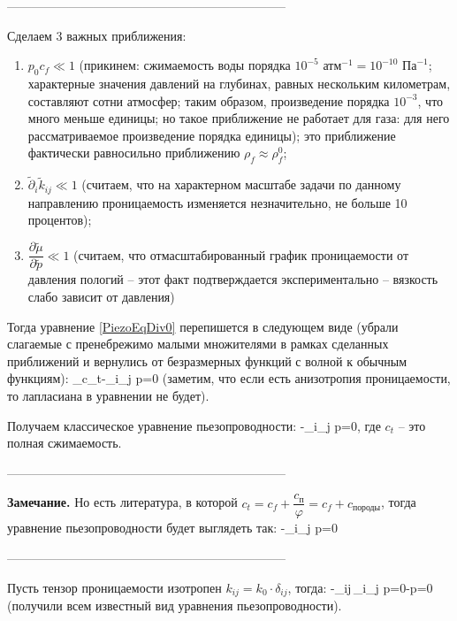 --------------------------------------------------------------------

Сделаем 3 важных приближения:
\begin{enumerate}
	\item $p_0 c_f\ll 1$ (прикинем: сжимаемость воды порядка $10^{-5}\text{ атм}^{-1}=10^{-10}\text{ Па}^{-1}$; характерные значения давлений на глубинах, равных нескольким километрам, составляют сотни атмосфер; таким образом, произведение порядка $10^{-3}$, что много меньше единицы; но такое приближение не работает для газа: для него рассматриваемое произведение порядка единицы); это приближение фактически равносильно приближению $\rho_f\approx\rho_f^0$;
	\item $\tilde{\partial}_i\tilde{k}_{ij}\ll 1$ (считаем, что на характерном масштабе задачи по данному направлению проницаемость изменяется незначительно, не больше 10 процентов);
	\item $\dfrac{\partial\tilde{\mu}}{\partial\tilde{p}}\ll 1$ (считаем, что отмасштабированный график проницаемости от давления пологий -- этот факт подтверждается экспериментально -- вязкость слабо зависит от давления)
\end{enumerate}

Тогда уравнение \eqref{PiezoEqDiv0} перепишется в следующем виде (убрали слагаемые с пренебрежимо малыми множителями в рамках сделанных приближений и вернулись от безразмерных функций с волной к обычным функциям):
\beq
{}_{c_t}-\partial_i\partial_j p=0
\eeq
(заметим, что если есть анизотропия проницаемости, то лапласиана в уравнении не будет).

Получаем классическое уравнение пьезопроводности:
\beq
{}-\partial_i\partial_j p=0,
\eeq
где $c_t$ -- это полная сжимаемость.

--------------------------------------------------------------------

\textbf{Замечание.} Но есть литература, в которой $c_t=c_f+\dfrac{c_\text{п}}{\varphi}=c_f+c_{\text{породы}}$, тогда уравнение пьезопроводности будет выглядеть так:
\beq
{}-\partial_i\partial_j p=0
\eeq

--------------------------------------------------------------------

Пусть тензор проницаемости изотропен $k_{ij}=k_0\cdot\delta_{ij}$, тогда:
\beq
{}-\delta_{ij}\,\partial_i\partial_j p=0\Leftrightarrow{}-\Delta p=0
\eeq
(получили всем известный вид уравнения пьезопроводности).

